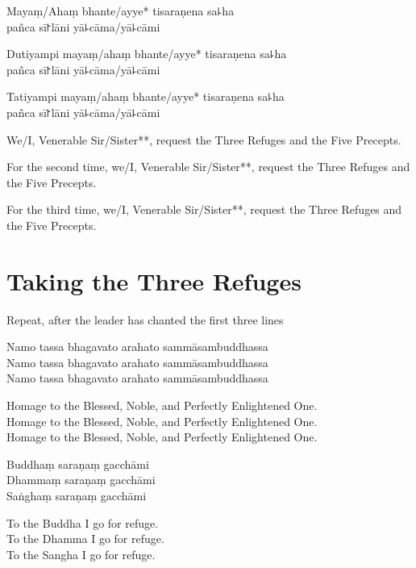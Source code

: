 Mayaṃ/Ahaṃ bhante/ayye* tisaraṇena sa꜕ha\\
pañca sī꜓lāni yā꜕cāma/yā꜕cāmi

Dutiyampi mayaṃ/ahaṃ bhante/ayye* tisaraṇena sa꜕ha\\
pañca sī꜓lāni yā꜕cāma/yā꜕cāmi

Tatiyampi mayaṃ/ahaṃ bhante/ayye* tisaraṇena sa꜕ha\\
pañca sī꜓lāni yā꜕cāma/yā꜕cāmi

\begin{english}
We/I, Venerable Sir/Sister**, request the Three Refuges and the Five Precepts.

For the second time, we/I, Venerable Sir/Sister**, request the Three Refuges and the Five Precepts.

For the third time, we/I, Venerable Sir/Sister**, request the Three Refuges and the Five Precepts.
\end{english}

\chapter{Taking the Three Refuges}

\begin{instruction}
  Repeat, after the leader has chanted the first three lines
\end{instruction}

Namo tassa bhagavato arahato sammāsambuddhassa\\
Namo tassa bhagavato arahato sammāsambuddhassa\\
Namo tassa bhagavato arahato sammāsambuddhassa

\begin{english}
  Homage to the Blessed, Noble, and Perfectly Enlightened One.\\
  Homage to the Blessed, Noble, and Perfectly Enlightened One.\\
  Homage to the Blessed, Noble, and Perfectly Enlightened One.
\end{english}

Buddhaṃ saraṇaṃ gacchāmi\\
Dhammaṃ saraṇaṃ gacchāmi\\
Saṅghaṃ saraṇaṃ gacchāmi

\begin{english}
  To the Buddha I go for refuge.\\
  To the Dhamma I go for refuge.\\
  To the Sangha I go for refuge.
\end{english}

